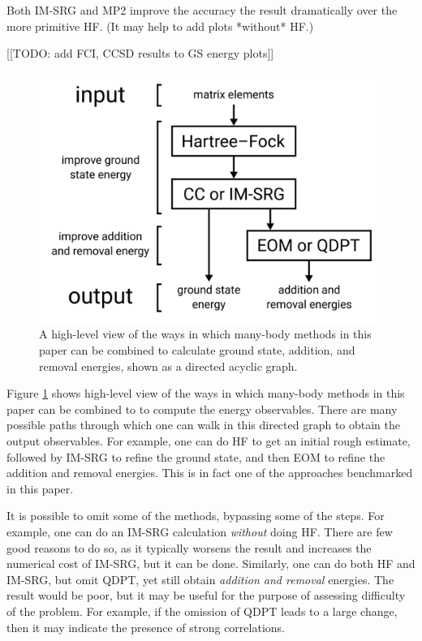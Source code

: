 Both IM-SRG and MP2 improve the accuracy the result dramatically over the more primitive HF.  (It may help to add plots *without* HF.)

[[TODO: add FCI, CCSD results to GS energy plots]]

\begin{figure}
  \centering
  \includegraphics[width=0.8\linewidth]{figures/fig-methods}
  \caption{A high-level view of the ways in which many-body methods in this paper can be combined to calculate ground state, addition, and removal energies, shown as a directed acyclic graph.}
  \label{fig:methods}
\end{figure}

Figure \ref{fig:methods} shows high-level view of the ways in which many-body methods in this paper can be combined to to compute the energy observables.  There are many possible paths through which one can walk in this directed graph to obtain the output observables.  For example, one can do HF to get an initial rough estimate, followed by IM-SRG to refine the ground state, and then EOM to refine the addition and removal energies.  This is in fact one of the approaches benchmarked in this paper.

It is possible to omit some of the methods, bypassing some of the steps.  For example, one can do an IM-SRG calculation \emph{without} doing HF.  There are few good reasons to do so, as it typically worsens the result and increases the numerical cost of IM-SRG, but it can be done.  Similarly, one can do both HF and IM-SRG, but omit QDPT, yet still obtain \emph{addition and removal} energies.  The result would be poor, but it may be useful for the purpose of assessing difficulty of the problem.  For example, if the omission of QDPT leads to a large change, then it may indicate the presence of strong correlations.

